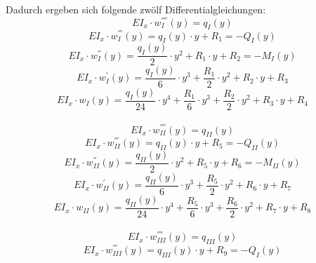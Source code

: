 \noindent Dadurch ergeben sich folgende zwölf Differentialgleichungen:
\begin{equation} \label{eq:7}
	EI_{x}\cdot w_{I}^{''''}(y) = q_{I}(y)
\end{equation}
\begin{equation}\label{eq:8}
	EI_{x}\cdot w_{I}^{'''}(y) = q_{I}(y)\cdot y + R_{1} = -Q_{I}(y)
\end{equation}
\begin{equation}\label{eq:9}
	EI_{x}\cdot w_{I}^{''}(y) = \frac{q_{I}(y)}{2}\cdot y^{2} + R_{1}\cdot y + R_{2} = -M_{I}(y)
\end{equation}
\begin{equation}\label{eq:10}
	EI_{x}\cdot w_{I}^{'}(y) = \frac{q_{I}(y)}{6}\cdot y^{3} + \frac{R_{1}}{2}\cdot y^{2} + R_{2}\cdot y + R_{3} 
\end{equation}
\begin{equation}\label{eq:11}
	EI_{x}\cdot w_{I}(y) = \frac{q_{I}(y)}{24}\cdot y^{4} + \frac{R_{1}}{6}\cdot y^{3} + \frac{R_{2}}{2}\cdot y^{2} + R_{3}\cdot y + R_{4}
\end{equation}\\
\begin{equation}\label{eq:12}
	EI_{x}\cdot w_{II}^{''''}(y) = q_{II}(y)
\end{equation}
\begin{equation}\label{eq:13}
	EI_{x}\cdot w_{II}^{'''}(y) = q_{II}(y)\cdot y + R_{5} = -Q_{II}(y)
\end{equation}
\begin{equation}\label{eq:14}
	EI_{x}\cdot w_{II}^{''}(y) = \frac{q_{II}(y)}{2}\cdot y^{2} + R_{5}\cdot y + R_{6} = -M_{II}(y)
\end{equation}
\begin{equation}\label{eq:15}
	EI_{x}\cdot w_{II}^{'}(y) = \frac{q_{II}(y)}{6}\cdot y^{3} + \frac{R_{5}}{2}\cdot y^{2} + R_{6}\cdot y + R_{7} 
\end{equation}
\begin{equation}\label{eq:16}
	EI_{x}\cdot w_{II}(y) = \frac{q_{II}(y)}{24}\cdot y^{4} + \frac{R_{5}}{6}\cdot y^{3} + \frac{R_{6}}{2}\cdot y^{2} + R_{7}\cdot y + R_{8}
\end{equation}\\
\begin{equation}\label{eq:17}
	EI_{x}\cdot w_{III}^{''''}(y) = q_{III}(y)
\end{equation}
\begin{equation}\label{eq:18}
	EI_{x}\cdot w_{III}^{'''}(y) = q_{III}(y)\cdot y + R_{9} = -Q_{I}(y)
\end{equation}
